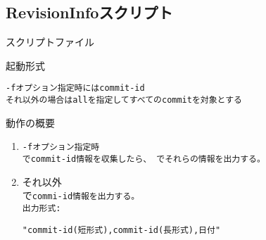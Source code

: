 
\subsection{RevisionInfoスクリプト}
\label{subsec:RevisionInfo}

\begin{Description}{スクリプトファイル}
\end{Description}

\medskip
\begin{Description}{起動形式}
	\begin{Args}
		{\tt{-f}オプション指定時には\tt{commit-id}\\
		それ以外の場合は\tt{all}を指定してすべてのcommitを対象とする}
	\end{Args}
	\begin{Opts}
	\end{Opts}
\end{Description}

\def\HD#1{\hfill\bf{#1}\hfill}

\medskip
動作の概要
\begin{enumerate}
  \item	\tt{-f}オプション指定時\\
	で\tt{commit-id}情報を収集したら、
	でそれらの情報を出力する。

  \item	それ以外\\
	で\tt{commi-id}情報を出力する。\\
	出力形式:
	\begin{narrow}
		\tt{"commit-id(短形式),commit-id(長形式),日付"}
	\end{narrow}
\end{enumerate}

